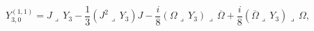 \begin{equation}
Y_{3,0}^{(1,1)} = J\lrcorner \, Y_3 -\frac{1}{3} (J^2 \lrcorner \, Y_3) J
 -\frac{i}{8} (\Omega \lrcorner \, Y_3) \lrcorner \, \overline{\Omega} 
 +\frac{i}{8} (\overline{\Omega} \lrcorner \, Y_3) \lrcorner \, \Omega ,
\end{equation} 
